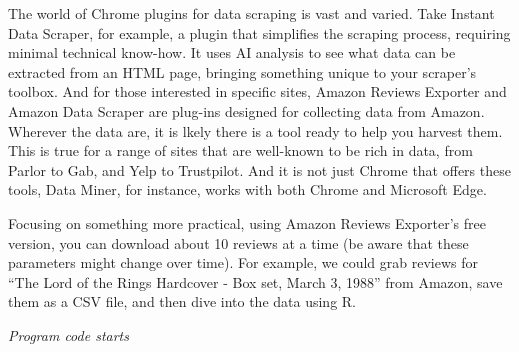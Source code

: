 The world of Chrome plugins for data scraping is vast and varied. Take
Instant Data Scraper, for example, a plugin that simplifies the scraping
process, requiring minimal technical know-how. It uses AI analysis to see
what data can be extracted from an HTML page, bringing something unique
to your scraper's toolbox. And for those interested in specific sites,
Amazon Reviews Exporter and Amazon Data Scraper are  plug-ins designed
for collecting data from Amazon. Wherever the data are, it is lkely there is
a tool ready to help you harvest them. This is true for a range of sites
that are well-known to be rich in data, from Parlor to Gab, and Yelp to
Trustpilot. And it is not just Chrome that offers these tools, Data Miner, for instance, works with both
Chrome and Microsoft Edge.

Focusing on something more practical, using Amazon Reviews Exporter's
free version, you can download about 10 reviews at a time (be
aware that these parameters might change over time). For example, we could grab
reviews for ``The Lord of the Rings Hardcover - Box set, March 3, 1988''
from Amazon, save them as a CSV file, and then dive into the data
using R.

\emph{Program code starts}

\begin{Shaded}
\begin{Highlighting}[]


\OtherTok{\textless{}{-}} \NormalTok{(}\NormalTok{, } \NormalTok{, } \NormalTok{)}

\OtherTok{\textless{}{-}} 

\end{Highlighting}
\end{Shaded}

